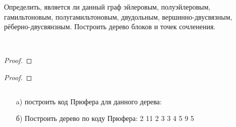 
\renewcommand*{\proofname}{Решение}
\begin{problem}
	Определить, является ли данный граф эйлеровым, полуэйлеровым, гамильтоновым, полугамильтоновым, двудольным, вершинно-двусвязным, рёберно-двусвянзным. Построить дерево блоков и точек сочленения.
    \begin{center}
    \\
    \end{center}
\end{problem}



\begin{problem}
\end{problem}
\begin{proof}
\end{proof}

\begin{problem}
\end{problem}
\begin{proof}
\end{proof}

\vspace{10mm}
\begin{problem} $ $\\
	\begin{itemize}
	    \item[a)] построить код Прюфера для данного дерева:
        \vspace{4mm}
        \begin{center}
        \end{center}
        \vspace{4mm}
        \item [б)] Построить дерево по коду Прюфера: 2 11 2 3 3 4 5 9 5
	\end{itemize}
\end{problem}

